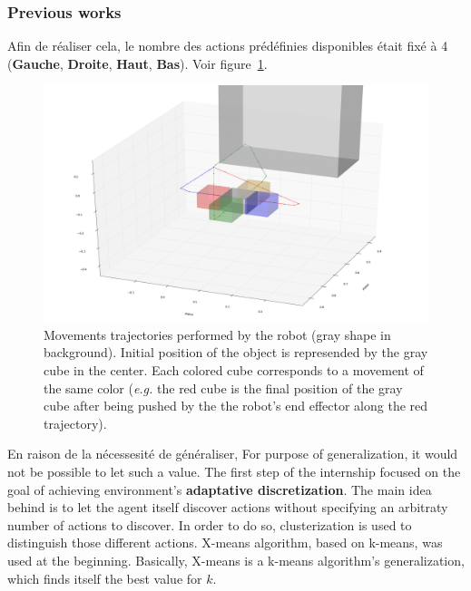 \documentclass{llncs}
\begin{document}
\subsubsection{Previous works}

Afin de réaliser cela, le nombre des actions prédéfinies disponibles était fixé à 4 (\textbf{Gauche}, \textbf{Droite}, \textbf{Haut}, \textbf{Bas}). Voir figure~\ref{fig:trajectories}.

\begin{figure}
	\centering
	\includegraphics[width=\textwidth]{figures/trajectories}
	\caption{Movements trajectories performed by the robot (gray shape in background). Initial position of the object is represended by the gray cube in the center. Each colored cube corresponds to a movement of the same color (\textit{e.g.} the red cube is the final position of the gray cube after being pushed by the the robot's end effector along the red trajectory).}
	\label{fig:trajectories}
\end{figure}

En raison de la nécessesité de généraliser,
For purpose of generalization, it would not be possible to let such a value. The first step of the internship focused on the goal of achieving environment's \textbf{adaptative discretization}. The main idea behind is to let the agent itself discover actions without specifying an arbitraty number of actions to discover.  In order to do so, clusterization is used to distinguish those different actions. X-means algorithm\cite{Pelleg:2000:XEK:645529.657808}, based on k-means, was used at the beginning. Basically, X-means is a k-means algorithm's generalization, which finds itself the best value for $k$.

%
\end{document}
